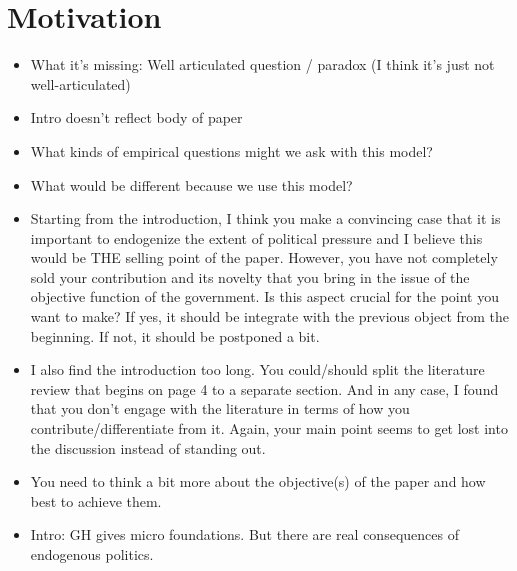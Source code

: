 \documentclass[12pt]{article}
\begin{document}
\section{Motivation}
		\begin{itemize}
			\item What it's missing: Well articulated question / paradox (I think it's just not well-articulated)
			\item Intro doesn't reflect body of paper
			\item What kinds of empirical questions might we ask with this model?
			\item What would be different because we use this model?
			\item Starting from the introduction, I think you make a convincing case that it is important to endogenize the extent of political pressure and I believe this would be THE selling point of the paper. However, you have not completely sold your contribution and its novelty that you bring in the issue of the objective function of the government. Is this aspect crucial for the point you want to make? If yes, it should be integrate with the previous object from the beginning. If not, it should be postponed a bit.
			\item I also find the introduction too long. You could/should split the literature review that begins on page 4 to a separate section. And in any case, I found that you don't engage with the literature in terms of how you contribute/differentiate from it. Again, your main point seems to get lost into the discussion instead of standing out.
			\item You need to think a bit more about the objective(s) of the paper and how best to achieve them.
			\item Intro: GH gives micro foundations. But there are real consequences of endogenous politics.
		\end{itemize}
		
\end{document}
